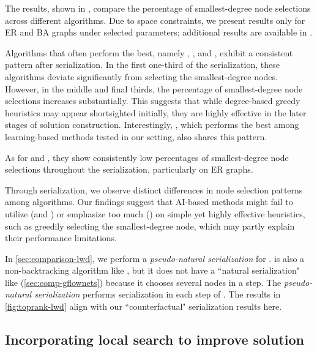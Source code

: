 The results, shown in , compare the percentage of smallest-degree node selections across different algorithms. Due to space constraints, we present results only for ER and BA graphs under selected parameters; additional results are available in .

Algorithms that often perform the best, namely \onlinemis, \redumis, and \isco,
exhibit a consistent pattern after serialization. In the first one-third of the serialization, these algorithms deviate significantly from selecting the smallest-degree nodes. However, in the middle and final thirds, the percentage of smallest-degree node selections increases substantially. This suggests that while degree-based greedy heuristics may appear shortsighted initially, they are highly effective in the later stages of solution construction. Interestingly, \lwd, which performs the best among learning-based methods tested in our setting, also shares this pattern.

As for \pcqo and \difusco, they show consistently low percentages of smallest-degree node selections throughout the serialization, particularly on ER graphs.

Through serialization, we observe distinct differences in node selection patterns among algorithms. Our findings suggest that AI-based methods might fail to utilize (\pcqo and \difusco) or emphasize too much (\gflownets) on simple yet highly effective heuristics, such as greedily selecting the smallest-degree node, which may partly explain their performance limitations.

In \cref{sec:comparison-lwd}, we perform a \emph{pseudo-natural serialization} for \lwd. \lwd is also a non-backtracking algorithm like \gflownets, but it does not have a ``natural serialization" like \gflownets  (\cref{sec:comp-gflownets}) because it chooses several nodes in a step. The \emph{pseudo-natural serialization} performs serialization in each step of \lwd. The results in \cref{fig:toprank-lwd} align with our ``counterfactual" serialization results here.

\subsection{Incorporating local search to improve solution}\label{sec:add-local-search}

